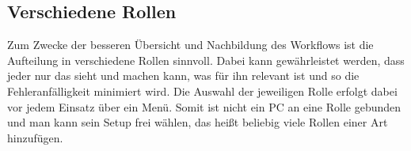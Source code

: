 \subsection{Verschiedene Rollen}
Zum Zwecke der besseren Übersicht und Nachbildung des Workflows ist die Aufteilung in verschiedene Rollen sinnvoll.  
Dabei kann gewährleistet werden, dass jeder nur das sieht und machen kann, was für ihn relevant ist und so die Fehleranfälligkeit minimiert wird. 
Die Auswahl der jeweiligen Rolle erfolgt dabei vor jedem Einsatz über ein Menü. Somit ist nicht ein PC an eine Rolle gebunden und man kann sein Setup frei wählen, das heißt beliebig viele Rollen einer Art hinzufügen.
